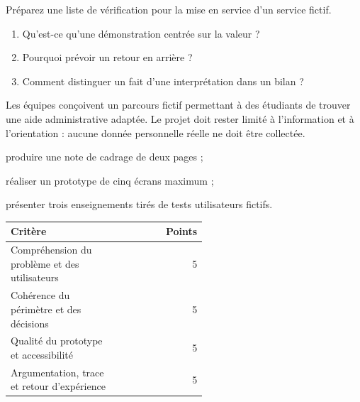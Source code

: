\documentclass[12pt,twoside]{upbcours}
\begin{document}
\begin{evalformative}
  Préparez une liste de vérification pour la mise en service d'un service fictif.
\end{evalformative}
\begin{autoevaluation}
  \begin{enumerate}
    \item Qu'est-ce qu'une démonstration centrée sur la valeur ?
    \item Pourquoi prévoir un retour en arrière ?
    \item Comment distinguer un fait d'une interprétation dans un bilan ?
  \end{enumerate}
\end{autoevaluation}

Les équipes conçoivent un parcours fictif permettant à des étudiants de trouver une aide
administrative adaptée. Le projet doit rester limité à l'information et à l'orientation :
aucune donnée personnelle réelle ne doit être collectée.
\begin{objectifs}
  \item produire une note de cadrage de deux pages ;
  \item réaliser un prototype de cinq écrans maximum ;
  \item présenter trois enseignements tirés de tests utilisateurs fictifs.
\end{objectifs}
\begin{tabular}{p{0.55\linewidth}r}
  \toprule
  Critère & Points\\
  \midrule
  Compréhension du problème et des utilisateurs & 5\\
  Cohérence du périmètre et des décisions & 5\\
  Qualité du prototype et accessibilité & 5\\
  Argumentation, trace et retour d'expérience & 5\\
  \bottomrule
\end{tabular}
\end{document}
